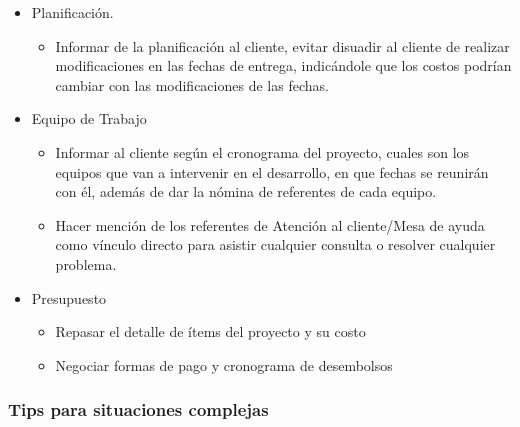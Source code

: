 \begin{itemize}
\begin{itemize}
		\item Planificación.
        
		\begin{itemize}
			\item Informar de la planificación al cliente, evitar disuadir al cliente de realizar modificaciones en las fechas de entrega, indicándole que los costos podrían cambiar con las modificaciones de las fechas.
	    \end{itemize}
        
		\item Equipo de Trabajo
        
    	\begin{itemize}
			\item Informar al cliente según el cronograma del proyecto, cuales son los equipos que van a intervenir en el desarrollo, en que fechas se reunirán con él, además de dar la nómina de referentes de cada equipo.
			\item Hacer mención de los referentes de Atención al cliente/Mesa de ayuda como vínculo directo para asistir cualquier consulta o resolver cualquier problema.
		\end{itemize}
        
		\item Presupuesto
        
	    \begin{itemize}
			\item Repasar el detalle de ítems del proyecto y su costo
			\item Negociar formas de pago y cronograma de desembolsos
		\end{itemize}
	\end{itemize}
\end{itemize}


\subsubsection{Tips para situaciones complejas}

